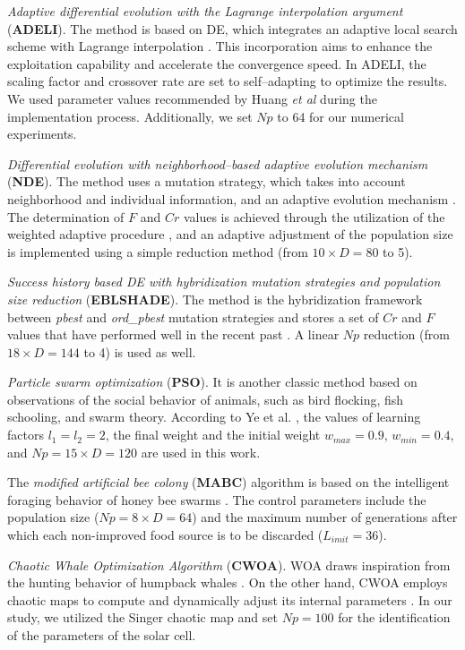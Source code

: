\documentclass[a4paper,fleqn]{cas-dc}
\begin{document}
\emph{Adaptive differential evolution with the Lagrange interpolation argument} (\textbf{ADELI}).
The method is based on DE, which integrates an adaptive local search scheme with Lagrange interpolation \cite{ADELI}.
This incorporation aims to enhance the exploitation capability and accelerate the convergence speed.
In ADELI, the scaling factor and crossover rate are set to self--adapting to optimize the results.
We used parameter values recommended by Huang \emph{et al} \cite{ADELI} during the implementation process.
Additionally, we set $N\!p$ to 64 for our numerical experiments.

\emph{Differential evolution with neighborhood--based adaptive evolution mechanism} (\textbf{NDE}).
The method uses a mutation strategy, which takes into account neighborhood and individual information, and an adaptive evolution mechanism \cite{NDE}.
The determination of $F$ and $C\!r$ values is achieved through the utilization of the weighted adaptive procedure \cite{Tanabe2014},
and an adaptive adjustment of the population size is implemented using a simple reduction method (from $10\times D=80$ to 5).

\emph{Success history based DE with hybridization mutation strategies and population size reduction} (\textbf{EBLSHADE}).
The method is the hybridization framework between \emph{pbest} and \emph{ord\_pbest} mutation strategies
and stores a set of $Cr$ and $F$ values that have performed well in the recent past \cite{EBLSHADE}.
A linear $N\!p$ reduction (from $18\times D=144$ to 4) is used as well.

\emph{Particle swarm optimization} (\textbf{PSO}).
It is another classic method based on observations of the social behavior of animals,
such as bird flocking, fish schooling, and swarm theory.
According to Ye et al. \cite{PSO},  the values of learning factors $l_1=l_2=2$,
the final weight and the initial weight $w_{max}=0.9$, $w_{min}=0.4$, and
$N\!p=15\times D=120$ are used in this work.

The \emph{modified artificial bee colony} (\textbf{MABC}) algorithm is based
on the intelligent foraging behavior of honey bee swarms \cite{MABC}.
The control parameters include the population size ($N\!p=8\times D=64$)
and the maximum number of generations after which each non-improved food source is to be discarded ($L_{imit}=36$).

\emph{Chaotic Whale Optimization Algorithm} (\textbf{CWOA}).
WOA draws inspiration from the hunting behavior of humpback whales \cite{WOA}.
On the other hand, CWOA employs chaotic maps to compute and dynamically adjust its internal parameters \cite{CWOA}.
In our study, we utilized the Singer chaotic map and set $N\!p=100$ for the identification of the parameters of the solar cell.
\end{document}
